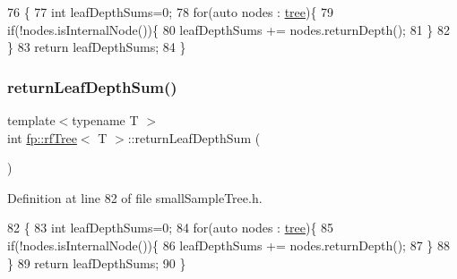 \begin{DoxyCode}
76                                                \{
77                     \textcolor{keywordtype}{int} leafDepthSums=0;
78                     \textcolor{keywordflow}{for}(\textcolor{keyword}{auto} nodes : \hyperlink{classfp_1_1rfTree_a1d5c209715f4044a85878c17e2b3ee53}{tree})\{
79                         \textcolor{keywordflow}{if}(!nodes.isInternalNode())\{
80                             leafDepthSums += nodes.returnDepth();
81                         \}
82                     \}
83                     \textcolor{keywordflow}{return} leafDepthSums;
84                 \}
\end{DoxyCode}
\mbox{\label{classfp_1_1rfTree_a7e0126c03547b4e6ed25b1c452255bbe}} 
\subsubsection{\texorpdfstring{return\+Leaf\+Depth\+Sum()}{returnLeafDepthSum()}\hspace{0.1cm}{\footnotesize\ttfamily [2/2]}}
{\footnotesize\ttfamily template$<$typename T $>$ \\
int \hyperlink{classfp_1_1rfTree}{fp\+::rf\+Tree}$<$ T $>$\+::return\+Leaf\+Depth\+Sum (\begin{DoxyParamCaption}{ }\end{DoxyParamCaption})\hspace{0.3cm}{\ttfamily [inline]}}



Definition at line 82 of file small\+Sample\+Tree.\+h.


\begin{DoxyCode}
82                                                \{
83                     \textcolor{keywordtype}{int} leafDepthSums=0;
84                     \textcolor{keywordflow}{for}(\textcolor{keyword}{auto} nodes : \hyperlink{classfp_1_1rfTree_a1d5c209715f4044a85878c17e2b3ee53}{tree})\{
85                         \textcolor{keywordflow}{if}(!nodes.isInternalNode())\{
86                             leafDepthSums += nodes.returnDepth();
87                         \}
88                     \}
89                     \textcolor{keywordflow}{return} leafDepthSums;
90                 \}
\end{DoxyCode}
\mbox{\label{classfp_1_1rfTree_ab439134c1e24059fe74f84ac8eff78dd}} 
